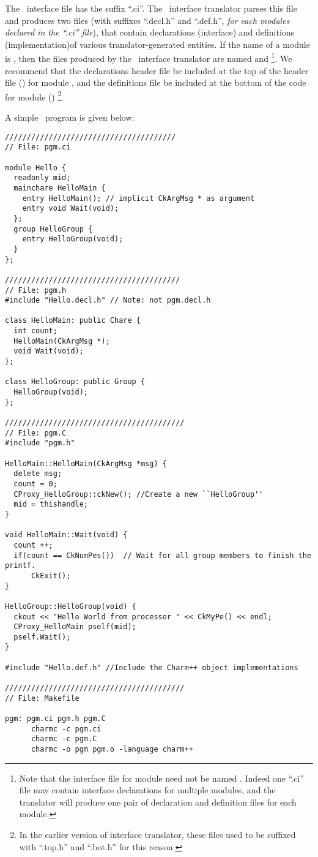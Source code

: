 The \charmpp\ interface file has the suffix ``.ci''. 
The \charmpp\ interface translator parses this file and produces two files 
(with suffixes ``.decl.h'' and ``.def.h'', {\em for each modules declared in the ``.ci'' file}), that contain declarations (interface) and definitions (implementation)of various translator-generated entities. If the name of a
module is , then the files produced by the \charmpp\ interface translator 
are named  and \footnote{Note that the interface 
file for module  need not be named . Indeed one ``.ci'' 
file may contain interface declarations for multiple modules, and the 
translator will produce one pair of declaration and definition files for each 
module.}.  We recommend that the declarations header file be included at the 
top of the header file () for module , and the definitions 
file be included at the bottom of the code for module ()
\footnote{In the earlier version of interface translator, these files used to 
be suffixed with ``.top.h'' and ``.bot.h'' for this reason.}.

A simple \charmpp\ program is given below:

\begin{verbatim}
///////////////////////////////////////
// File: pgm.ci

module Hello {
  readonly mid;
  mainchare HelloMain {
    entry HelloMain(); // implicit CkArgMsg * as argument
    entry void Wait(void);
  };
  group HelloGroup {
    entry HelloGroup(void);
  } 
};

////////////////////////////////////////
// File: pgm.h
#include "Hello.decl.h" // Note: not pgm.decl.h

class HelloMain: public Chare {
  int count;
  HelloMain(CkArgMsg *);
  void Wait(void);
};

class HelloGroup: public Group {
  HelloGroup(void);
};

/////////////////////////////////////////
// File: pgm.C
#include "pgm.h"

HelloMain::HelloMain(CkArgMsg *msg) {
  delete msg;
  count = 0;
  CProxy_HelloGroup::ckNew(); //Create a new ``HelloGroup''
  mid = thishandle;
}

void HelloMain::Wait(void) {
  count ++;
  if(count == CkNumPes())  // Wait for all group members to finish the printf.
      CkExit();	
}

HelloGroup::HelloGroup(void) {
  ckout << "Hello World from processor " << CkMyPe() << endl;
  CProxy_HelloMain pself(mid);
  pself.Wait();
}

#include "Hello.def.h" //Include the Charm++ object implementations

/////////////////////////////////////////
// File: Makefile

pgm: pgm.ci pgm.h pgm.C
      charmc -c pgm.ci
      charmc -c pgm.C
      charmc -o pgm pgm.o -language charm++

\end{verbatim}

